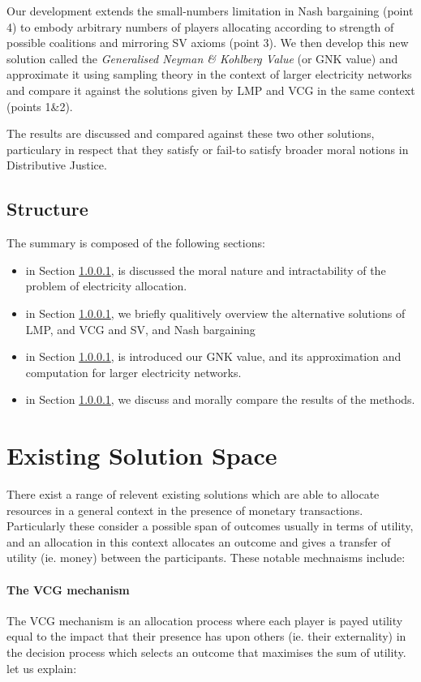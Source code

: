 \documentclass[
10pt, %
a4paper, %
oneside, %
headinclude,footinclude, %
BCOR5mm, %
]{scrartcl}
\begin{document}
Our development extends the small-numbers limitation in Nash bargaining (point 4) to embody arbitrary numbers of players allocating according to strength of possible coalitions and mirroring SV axioms (point 3).
We then develop this new solution called the \textit{Generalised Neyman \& Kohlberg Value} (or GNK value) and approximate it using sampling theory in the context of larger electricity networks and compare it against the solutions given by LMP and VCG in the same context (points 1\&2).

The results are discussed and compared against these two other solutions, particulary in respect that they satisfy or fail-to satisfy broader moral notions in Distributive Justice.

\subsection{Structure}
The summary is composed of the following sections:

\begin{itemize}[noitemsep]
\item	in Section \ref{}, is discussed the moral nature and intractability of the problem of electricity allocation.
\item	in Section \ref{}, we briefly qualitively overview the alternative solutions of LMP, and VCG and SV, and Nash bargaining
\item	in Section \ref{}, is introduced our GNK value, and its approximation and computation for larger electricity networks.
\item	in Section \ref{}, we discuss and morally compare the results of the methods.
\end{itemize}


\section{Existing Solution Space}

There exist a range of relevent existing solutions which are able to allocate resources in a general context in the presence of monetary transactions.
Particularly these consider a possible span of outcomes usually in terms of utility, and an allocation in this context allocates an outcome and gives a transfer of utility (ie. money) between the participants.
These notable mechnaisms include:

\paragraph{The VCG mechanism}
The VCG mechanism is an allocation process where each player is payed utility equal to the impact that their presence has upon others (ie. their externality) in the decision process which selects an outcome that maximises the sum of utility. let us explain:
\end{document}
